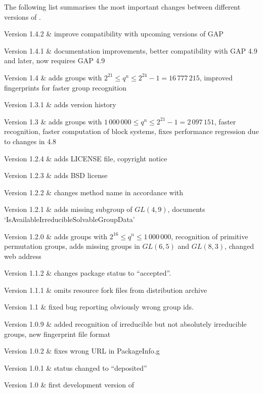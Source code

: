 
The following list summarises the most important changes between different versions of \IRREDSOL.

\beginitems
Version 1.4.2 &
	improve compatibility with upcoming versions of GAP

Version 1.4.1 &
	documentation improvements, better compatibility with GAP 4.9 and later, now requires GAP 4.9

Version 1.4 &
	adds groups with $2^{21} \leq q^n \leq 2^{24} - 1 = 16\,777\,215$, improved fingerprints for faster
	group recognition

Version 1.3.1 &
	adds version history
	
Version 1.3 &
	adds groups with $1\,000\,000 \leq q^n \leq 2^{21} - 1 = 2\,097\,151$, faster recognition, faster computation of block systems, fixes performance regression due to changes in {\GAP} 4.8
	
Version 1.2.4 &
	adds LICENSE file, copyright notice
	
Version 1.2.3 & 
	adds BSD license
	
Version 1.2.2 &
	changes method name in accordance with {\GAP}
	
Version 1.2.1 &
	adds missing subgroup of $GL(4,9)$, documents `IsAvailableIrreducibleSolvableGroupData'
	
Version 1.2.0 &
	adds groups with $2^{16} \leq q^n \leq 1\,000\,000$, recognition of primitive permutation groups, adds missing groups in $GL(6,5)$ and $GL(8,3)$, changed web address

Version 1.1.2 &
	changes package status to ``accepted''.
	
Version 1.1.1 & 
	omits resource fork files from distribution archive
	
Version 1.1 &
	fixed bug reporting obviously wrong group ids.
	
Version 1.0.9 & 
	added recognition of irreducible but not absolutely irreducible groups, new fingerprint file format
	
Version 1.0.2 & 
	fixes wrong URL in PackageInfo.g
	
Version 1.0.1 &
	status changed to ``deposited''
	
Version 1.0 &
 	first development version of {\IRREDSOL}
	
\enditems

